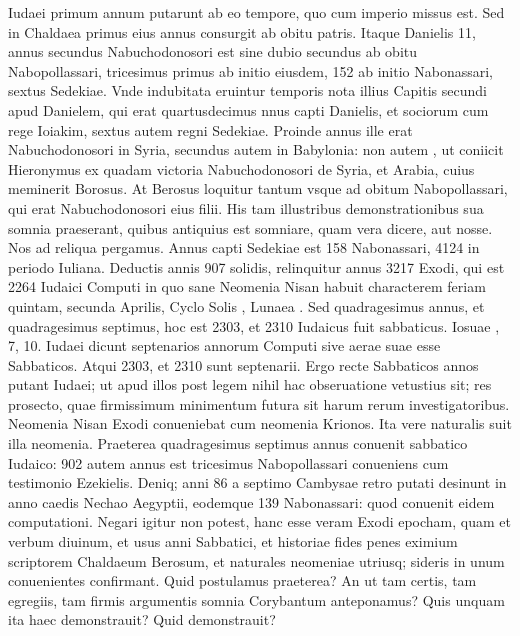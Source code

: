 Iudaei primum annum putarunt ab eo tempore, quo
cum imperio missus est. Sed in Chaldaea primus eius annus consurgit
ab obitu patris.
Itaque Danielis 11, annus secundus Nabuchodonosori
est sine dubio secundus ab obitu Nabopollassari, tricesimus
primus ab initio eiusdem, 152 ab initio Nabonassari, sextus
Sedekiae.
Vnde indubitata eruintur temporis nota illius Capitis secundi
apud Danielem, qui erat quartusdecimus nnus capti Danielis,
et sociorum cum rege Ioiakim, sextus autem regni Sedekiae.
Proinde annus ille erat  Nabuchodonosori
 in Syria, secundus
autem in Babylonia: non autem , ut coniicit Hieronymus
ex quadam victoria Nabuchodonosori de Syria, et Arabia, cuius
meminerit Borosus.
At Berosus loquitur tantum vsque ad obitum
Nabopollassari, qui erat  Nabuchodonosori eius filii.
His tam illustribus demonstrationibus sua somnia praeserant,
 quibus antiquius
est somniare, quam vera dicere, aut nosse.
Nos ad reliqua
pergamus.
Annus capti Sedekiae est 158 Nabonassari, 4124 in periodo Iuliana.
Deductis annis 907 solidis, relinquitur annus 3217
Exodi, qui est 2264 Iudaici Computi in quo sane Neomenia Nisan
habuit characterem feriam quintam, secunda Aprilis, Cyclo
Solis , Lunaea .
Sed quadragesimus annus, et quadragesimus
septimus, hoc est 2303, et 2310 Iudaicus fuit sabbaticus.
Iosuae
, 7, 10.
Iudaei dicunt septenarios annorum Computi sive aerae
suae esse Sabbaticos.
Atqui 2303, et 2310 sunt septenarii.
Ergo recte
Sabbaticos annos putant Iudaei; ut apud illos post legem nihil
hac obseruatione vetustius sit; res prosecto, quae firmissimum
minimentum futura sit harum rerum investigatoribus.
Neomenia Nisan Exodi conueniebat cum neomenia Krionos.
Ita vere naturalis suit illa neomenia.
Praeterea quadragesimus septimus
annus conuenit sabbatico Iudaico: 902 autem annus est tricesimus
Nabopollassari conueniens cum testimonio Ezekielis.
Deniq; anni 86 a septimo Cambysae retro putati desinunt in anno
caedis Nechao Aegyptii, eodemque 139 Nabonassari: quod conuenit
eidem computationi.
Negari igitur non potest, hanc esse veram
Exodi epocham, quam et verbum diuinum, et usus anni Sabbatici,
et historiae fides penes eximium scriptorem Chaldaeum
Berosum, et naturales neomeniae utriusq; sideris in unum conuenientes
confirmant.
Quid postulamus praeterea?
An ut tam certis,
tam egregiis, tam firmis argumentis somnia Corybantum anteponamus?
Quis unquam ita haec demonstrauit?
Quid demonstrauit?


